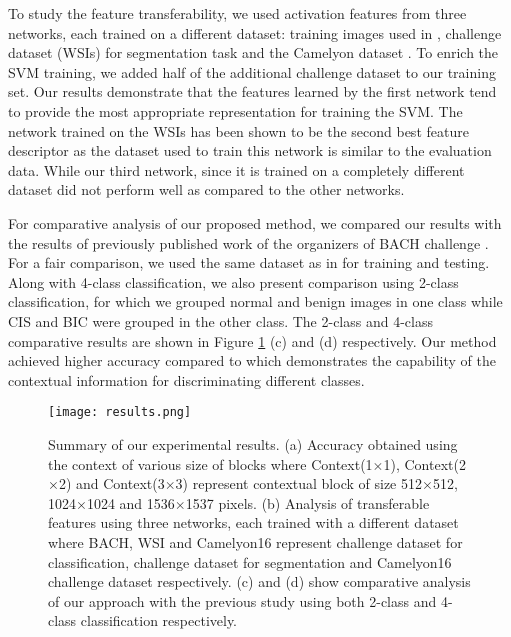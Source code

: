 \documentclass[runningheads,a4paper]{llncs}
\begin{document}
To study the feature transferability, we used activation features from three networks, each trained on a different dataset: training images used in \cite{araujo2017classification}, challenge dataset (WSIs) for segmentation task and the Camelyon dataset \cite{bejnordi2017diagnostic}. To enrich the SVM training, we added half of the additional challenge dataset to our training set. Our results demonstrate that the features learned by the first network tend to provide the most appropriate representation for training the SVM. The network trained on the WSIs has been shown to be the second best feature descriptor as the dataset used to train this network is similar to the evaluation data. While our third network, since it is trained on a completely different dataset did not perform well as compared to the other networks.
  
For comparative analysis of our proposed method, we compared our results with the results of previously published work of the organizers of BACH challenge \cite{araujo2017classification}. For a fair comparison, we used the same dataset as in \cite{araujo2017classification} for training and testing. Along with 4-class classification, we also present comparison using 2-class classification, for which we grouped normal and benign images in one class while CIS and BIC were grouped in the other class. The 2-class and 4-class comparative results are shown in Figure \ref{fig:comparison_results} (c) and (d) respectively. Our method achieved higher accuracy compared to \cite{araujo2017classification} which demonstrates the capability of the contextual information for discriminating different classes.

\begin{figure}[ht]
\centering
\texttt{[image: results.png]}
\caption{Summary of our experimental results. (a) Accuracy obtained using the context of various size of blocks where Context(1$\times$1), Context(2$\times$2) and Context(3$\times$3) represent contextual block of size 512$\times$512, 1024$\times$1024 and 1536$\times$1537 pixels. (b) Analysis of transferable features using three networks, each trained with a different dataset where BACH, WSI and Camelyon16 represent challenge dataset for classification, challenge dataset for segmentation and Camelyon16 challenge dataset respectively. (c) and (d) show comparative analysis of our approach with the previous study \cite{araujo2017classification} using both 2-class and 4-class classification respectively.}
\label{fig:comparison_results}
\end{figure}
\end{document}
